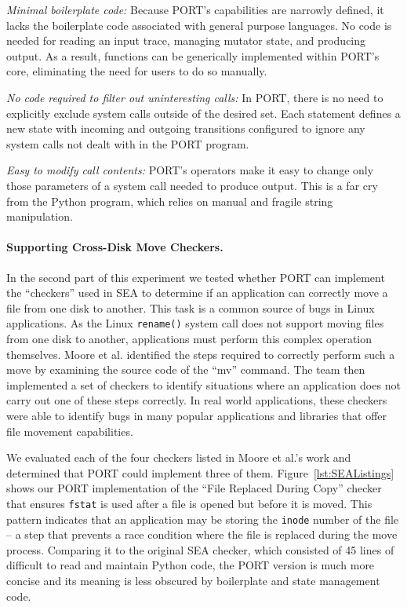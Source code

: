 \textit{Minimal boilerplate code:} Because PORT's capabilities are narrowly defined, it lacks the boilerplate
code associated with general purpose languages. No code is needed for 
reading an input trace, managing mutator state, and producing output.
As a result,
functions can be generically implemented within PORT's core, eliminating
the need for users to do so manually.

\textit{No code required to filter out uninteresting calls:}
In PORT, there is no
need to explicitly exclude system
calls outside of the desired set.  Each statement defines a new state with
incoming and outgoing transitions configured to ignore any system calls not
dealt with in the PORT program.

\textit{Easy to modify call contents:}  PORT's operators make it
easy to change only those parameters  of a system call
 needed to produce output.
This is a far cry
from the Python program, which relies on manual and fragile string manipulation.

\paragraph{Supporting Cross-Disk Move Checkers.}

In the second part of this experiment we tested whether PORT can
implement the ``checkers'' used in SEA to determine if an
application can correctly move a file from one disk to another.
This task is a common source of bugs in Linux applications. As the
Linux
{\tt rename()} system call does not support moving files from one disk to
another,
applications must perform this complex
operation themselves.
Moore et al. identified the steps required to
correctly perform such a move by examining the source code of the ``mv''
command. The team then implemented a set of checkers to identify situations where an application does not carry out one
of these steps correctly. 
In real world applications,
these checkers were able to identify bugs
in many popular applications and libraries that offer file movement
capabilities.

We evaluated each of the four checkers listed in Moore et al.'s work and
determined that PORT could implement three of them.
Figure~\ref{lst:SEAListings} shows our PORT implementation of
the ``File Replaced During Copy'' checker
that ensures {\tt fstat} is used after a file is opened but
before it is moved.  This pattern indicates that an application may be
storing the {\tt inode} number of the file -- a step that prevents a race
condition where the file is replaced during the move process.
Comparing it to the
original SEA checker,
which consisted of 45 lines of difficult to read and maintain Python code,
the PORT version is much more concise and its meaning is
less obscured by boilerplate and state management code.

